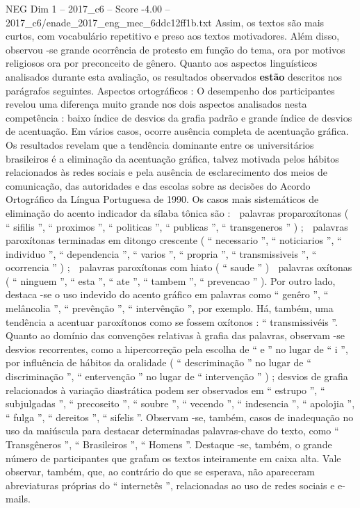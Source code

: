 \begin{textsample}{NEG Dim 1 – 2017\_c6 – Score -4.00 – 2017\_c6/enade\_2017\_eng\_mec\_6ddc12ff1b.txt}
Assim, os textos são mais curtos, com vocabulário repetitivo e preso aos textos motivadores.
Além disso, observou -se grande ocorrência de protesto em função do tema, ora por motivos religiosos ora por preconceito de gênero.
Quanto aos aspectos linguísticos analisados durante esta avaliação, os resultados observados \textbf{estão} descritos nos parágrafos seguintes.
Aspectos ortográficos : O desempenho dos participantes revelou uma diferença muito grande nos dois aspectos analisados nesta competência : baixo índice de desvios da grafia padrão e grande índice de desvios de acentuação.
Em vários casos, ocorre ausência completa de acentuação gráfica.
Os resultados revelam que a tendência dominante entre os universitários brasileiros é a eliminação da acentuação gráfica, talvez motivada pelos hábitos relacionados às redes sociais e pela ausência de esclarecimento dos meios de comunicação, das autoridades e das escolas sobre as decisões do Acordo Ortográfico da Língua Portuguesa de 1990.
Os casos mais sistemáticos de eliminação do acento indicador da sílaba tônica são :  palavras proparoxítonas ( “ sifilis ”, “ proximos ”, “ politicas ”, “ publicas ”, “ transgeneros ” ) ;  palavras paroxítonas terminadas em ditongo crescente ( “ necessario ”, “ noticiarios ”, “ individuo ”, “ dependencia ”, “ varios ”, “ propria ”, “ transmissiveis ”, “ ocorrencia ” ) ;  palavras paroxítonas com hiato ( “ saude ” )  palavras oxítonas ( “ ninguem ”, “ esta ”, “ ate ”, “ tambem ”, “ prevencao ” ).
Por outro lado, destaca -se o uso indevido do acento gráfico em palavras como “ genêro ”, “ melâncolia ”, “ prevênção ”, “ intervênção ”, por exemplo.
Há, também, uma tendência a acentuar paroxítonos como se fossem oxítonos : “ transmissivéis ”.
Quanto ao domínio das convenções relativas à grafia das palavras, observam -se desvios recorrentes, como a hipercorreção pela escolha de “ e ” no lugar de “ i ”, por influência de hábitos da oralidade ( “ descriminação ” no lugar de “ discriminação ”, “ entervenção ” no lugar de “ intervenção ” ) ; desvios de grafia relacionados à variação diastrática podem ser observados em “ estrupo ”, “ subjulgadas ”, “ precoseito ”, “ soubre ”, “ vecendo ”, “ indesencia ”, “ apolojia ”, “ fulga ”, “ dereitos ”, “ sifelis ”.
Observam -se, também, casos de inadequação no uso da maiúscula para destacar determinadas palavras-chave do texto, como “ Transgêneros ”, “ Brasileiros ”, “ Homens ”.
Destaque -se, também, o grande número de participantes que grafam os textos inteiramente em caixa alta.
Vale observar, também, que, ao contrário do que se esperava, não apareceram abreviaturas próprias do “ internetês ”, relacionadas ao uso de redes sociais e e-mails.

\end{textsample}
